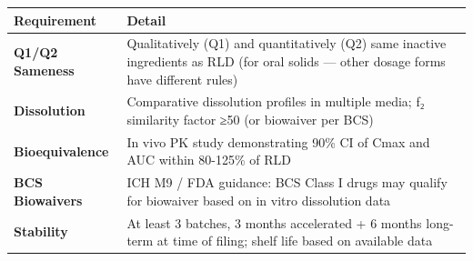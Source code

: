 \documentclass[
  11pt,
  a4paper,
]{report}
\begin{document}
\begin{longtable}[]{@{}ll@{}}
\toprule
\begin{minipage}[b]{0.56\columnwidth}\raggedright
Requirement\strut
\end{minipage} & \begin{minipage}[b]{0.38\columnwidth}\raggedright
Detail\strut
\end{minipage}\tabularnewline
\midrule
\endhead
\begin{minipage}[t]{0.56\columnwidth}\raggedright
\textbf{Q1/Q2 Sameness}\strut
\end{minipage} & \begin{minipage}[t]{0.38\columnwidth}\raggedright
Qualitatively (Q1) and quantitatively (Q2) same inactive ingredients as
RLD (for oral solids --- other dosage forms have different rules)\strut
\end{minipage}\tabularnewline
\begin{minipage}[t]{0.56\columnwidth}\raggedright
\textbf{Dissolution}\strut
\end{minipage} & \begin{minipage}[t]{0.38\columnwidth}\raggedright
Comparative dissolution profiles in multiple media; f₂ similarity factor
≥50 (or biowaiver per BCS)\strut
\end{minipage}\tabularnewline
\begin{minipage}[t]{0.56\columnwidth}\raggedright
\textbf{Bioequivalence}\strut
\end{minipage} & \begin{minipage}[t]{0.38\columnwidth}\raggedright
In vivo PK study demonstrating 90\% CI of Cmax and AUC within 80-125\%
of RLD\strut
\end{minipage}\tabularnewline
\begin{minipage}[t]{0.56\columnwidth}\raggedright
\textbf{BCS Biowaivers}\strut
\end{minipage} & \begin{minipage}[t]{0.38\columnwidth}\raggedright
ICH M9 / FDA guidance: BCS Class I drugs may qualify for biowaiver based
on in vitro dissolution data\strut
\end{minipage}\tabularnewline
\begin{minipage}[t]{0.56\columnwidth}\raggedright
\textbf{Stability}\strut
\end{minipage} & \begin{minipage}[t]{0.38\columnwidth}\raggedright
At least 3 batches, 3 months accelerated + 6 months long-term at time of
filing; shelf life based on available data\strut

\end{minipage}
\end{longtable}
\end{document}
